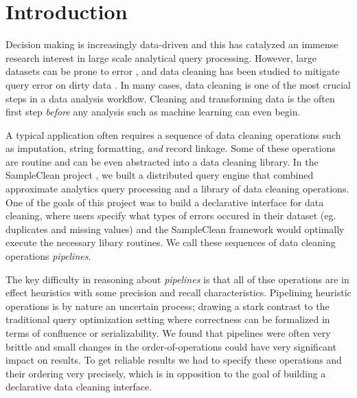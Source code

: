\section{Introduction}
Decision making is increasingly data-driven and this has catalyzed an immense research interest in large scale analytical query processing.
However, large datasets can be prone to error \cite{Gartner}, and data cleaning has been studied to mitigate query error on dirty data \cite{dasu2003exploratory, mayfield2010eracer, openrefine, wrangler, DBLP:conf/sigmod/DallachiesaEEEIOT13, DBLP:conf/pervasive/JefferyAFHW06}.
In many cases, data cleaning is one of the most crucial steps in a data analysis workflow.
Cleaning and transforming data is the often first step \emph{before} any analysis such as machine learning can even begin.

A typical application often requires a sequence of data cleaning operations 
such as imputation, string formatting, \emph{and} record linkage.
Some of these operations are routine and can be even abstracted into a data cleaning library.
In the SampleClean project \cite{wang1999sample}, we built a distributed query engine that combined approximate analytics query processing 
and a library of data cleaning operations.
One of the goals of this project was to build a declarative interface for data cleaning, where users specify what types of errors
occured in their dataset (eg. duplicates and missing values) and the SampleClean framework would optimally execute the necessary libary routines.
We call these sequences of data cleaning operations \emph{pipelines}.

The key difficulty in reasoning about \emph{pipelines} is that all of thse operations are in effect heuristics with some precision and recall characteristics.
Pipelining heuristic operations is by nature an uncertain process; drawing a stark contrast to the traditional query optimization setting where correctness can be formalized in terms of confluence or serializability. 
We found that pipelines were often very brittle and small changes in the order-of-operations could have very significant impact on results.
To get reliable results we had to specify these operations and their ordering very precisely, which is in opposition to the goal of building a declarative data cleaning interface.

